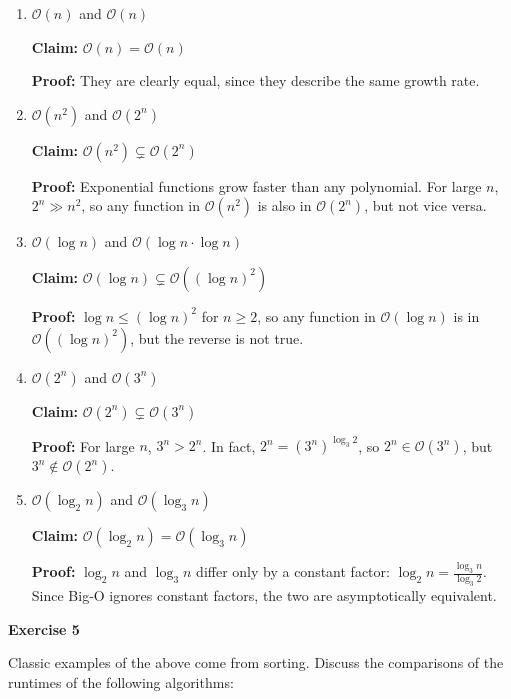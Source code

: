 \documentclass{article}
\theoremstyle{theorem}
\theoremstyle{definition}
\theoremstyle{remark}
\begin{document}
\begin{enumerate}
    \item \( \mathcal{O}(n) \) and \( \mathcal{O}(n) \)

    \textbf{Claim:} \( \mathcal{O}(n) = \mathcal{O}(n) \)

    \textbf{Proof:} They are clearly equal, since they describe the same growth rate.

    \item \( \mathcal{O}(n^2) \) and \( \mathcal{O}(2^n) \)

    \textbf{Claim:} \( \mathcal{O}(n^2) \subsetneq \mathcal{O}(2^n) \)

    \textbf{Proof:} Exponential functions grow faster than any polynomial. For large \( n \), \( 2^n \gg n^2 \), so any function in \( \mathcal{O}(n^2) \) is also in \( \mathcal{O}(2^n) \), but not vice versa.

    \item \( \mathcal{O}(\log n) \) and \( \mathcal{O}(\log n \cdot \log n) \)

    \textbf{Claim:} \( \mathcal{O}(\log n) \subsetneq \mathcal{O}((\log n)^2) \)

    \textbf{Proof:} \( \log n \leq (\log n)^2 \) for \( n \geq 2 \), so any function in \( \mathcal{O}(\log n) \) is in \( \mathcal{O}((\log n)^2) \), but the reverse is not true.

    \item \( \mathcal{O}(2^n) \) and \( \mathcal{O}(3^n) \)

    \textbf{Claim:} \( \mathcal{O}(2^n) \subsetneq \mathcal{O}(3^n) \)

    \textbf{Proof:} For large \( n \), \( 3^n > 2^n \). In fact, \( 2^n = (3^n)^{\log_3 2} \), so \( 2^n \in \mathcal{O}(3^n) \), but \( 3^n \notin \mathcal{O}(2^n) \).

    \item \( \mathcal{O}(\log_2 n) \) and \( \mathcal{O}(\log_3 n) \)

    \textbf{Claim:} \( \mathcal{O}(\log_2 n) = \mathcal{O}(\log_3 n) \)

    \textbf{Proof:} \( \log_2 n \) and \( \log_3 n \) differ only by a constant factor: \( \log_2 n = \frac{\log_3 n}{\log_3 2} \). Since Big-O ignores constant factors, the two are asymptotically equivalent.
\end{enumerate}

\textbf{Exercise 5}

Classic examples of the above come from sorting. Discuss the comparisons of the runtimes of the following algorithms:
\end{document}
